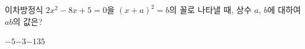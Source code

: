 이차방정식 $2x^2-8x+5=0$을 $(x+a)^2=b$의 꼴로 나타낼 때, 상수 $a$, $b$에 대하여 $ab$의 값은?
\begin{choices32}{$-5$}{$-3$}{$-1$}{$3$}{$5$}\end{choices32}
